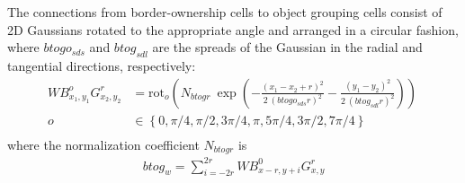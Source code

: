 The connections from border-ownership cells to object grouping cells consist of 2D Gaussians rotated to the appropriate angle and arranged in a circular fashion, 
where $btogo_{sds}$ and $btog_{sdl}$ are the spreads of the Gaussian in the radial and tangential directions, respectively:
\begin{align}
	WB^{o}_{x_1,y_1}G^{r}_{x_2,y_2}&=\text{rot}_{o}\left(N_{btogr}\: \exp\left(-\frac{(x_1-x_2+r)^2}{2\: (btogo_{sds} r)^2}
	-\frac{(y_1-y_2)^2}{2\: (btog_{sdl} r)^2}\right)\right)\  \nonumber\\  
	o&\in \left\{0,\pi/4,\pi/2,3\pi/4,\pi,5\pi/4,3\pi/2,7\pi/4\right\} \nonumber\\
\end{align}
%
%
%
%
%
%
%
where the normalization coefficient $N_{btogr}$ is
\begin{align}
	btog_w=\sum^{2r}_{i=-2r} WB^{0}_{x-r,y+i}G^{r}_{x,y}
\end{align}

